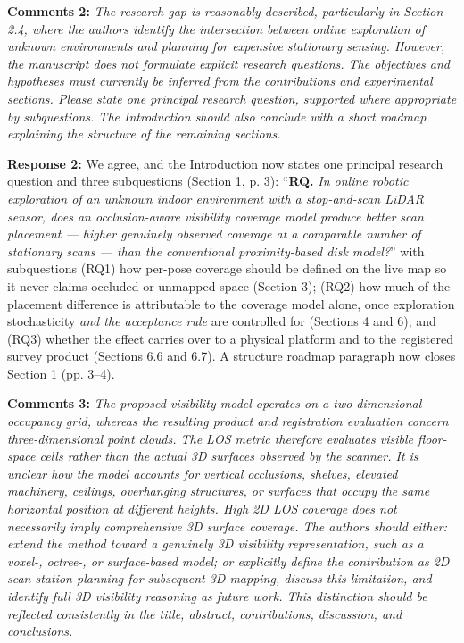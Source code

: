 \documentclass[11pt]{article}
\begin{document}
\medskip

\textbf{Comments 2:} \emph{The research gap is reasonably described, particularly in Section 2.4, where the authors identify the intersection between online exploration of unknown environments and planning for expensive stationary sensing. However, the manuscript does not formulate explicit research questions. The objectives and hypotheses must currently be inferred from the contributions and experimental sections. Please state one principal research question, supported where appropriate by subquestions. The Introduction should also conclude with a short roadmap explaining the structure of the remaining sections.}

\textbf{Response 2:} We agree, and the Introduction now states one principal research question and three subquestions (Section 1, p. 3):
“\textbf{RQ.} \emph{In online robotic exploration of an unknown indoor environment with a stop-and-scan LiDAR sensor, does an occlusion-aware visibility coverage model produce better scan placement — higher genuinely observed coverage at a comparable number of stationary scans — than the conventional proximity-based disk model?}”
with subquestions (RQ1) how per-pose coverage should be defined on the live map so it never claims occluded or unmapped space (Section 3); (RQ2) how much of the placement difference is attributable to the coverage model alone, once exploration stochasticity \emph{and the acceptance rule} are controlled for (Sections 4 and 6); and (RQ3) whether the effect carries over to a physical platform and to the registered survey product (Sections 6.6 and 6.7). A structure roadmap paragraph now closes Section 1 (pp. 3–4).

\medskip

\textbf{Comments 3:} \emph{The proposed visibility model operates on a two-dimensional occupancy grid, whereas the resulting product and registration evaluation concern three-dimensional point clouds. The LOS metric therefore evaluates visible floor-space cells rather than the actual 3D surfaces observed by the scanner. It is unclear how the model accounts for vertical occlusions, shelves, elevated machinery, ceilings, overhanging structures, or surfaces that occupy the same horizontal position at different heights. High 2D LOS coverage does not necessarily imply comprehensive 3D surface coverage. The authors should either: extend the method toward a genuinely 3D visibility representation, such as a voxel-, octree-, or surface-based model; or explicitly define the contribution as 2D scan-station planning for subsequent 3D mapping, discuss this limitation, and identify full 3D visibility reasoning as future work. This distinction should be reflected consistently in the title, abstract, contributions, discussion, and conclusions.}
\end{document}
